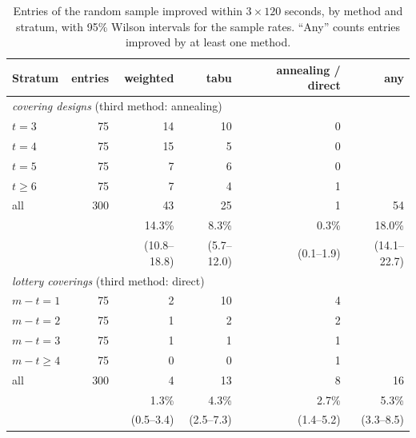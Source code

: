 \documentclass[11pt]{article}
\theoremstyle{remark}
\begin{document}
\begin{table}[t]
\centering
\begin{tabular}{lrrrrr}
\toprule
Stratum & entries & weighted & tabu & annealing / direct & any \\
\midrule
\multicolumn{6}{l}{\emph{covering designs} (third method: annealing)} \\
$t=3$ & 75 & 14 & 10 & 0 & \\
$t=4$ & 75 & 15 & 5 & 0 & \\
$t=5$ & 75 & 7 & 6 & 0 & \\
$t\ge 6$ & 75 & 7 & 4 & 1 & \\
all & 300 & 43 & 25 & 1 & 54 \\
 & & 14.3\% & 8.3\% & 0.3\% & 18.0\% \\
 & & (10.8--18.8) & (5.7--12.0) & (0.1--1.9) & (14.1--22.7) \\
\midrule
\multicolumn{6}{l}{\emph{lottery coverings} (third method: direct)} \\
$m-t=1$ & 75 & 2 & 10 & 4 & \\
$m-t=2$ & 75 & 1 & 2 & 2 & \\
$m-t=3$ & 75 & 1 & 1 & 1 & \\
$m-t\ge 4$ & 75 & 0 & 0 & 1 & \\
all & 300 & 4 & 13 & 8 & 16 \\
 & & 1.3\% & 4.3\% & 2.7\% & 5.3\% \\
 & & (0.5--3.4) & (2.5--7.3) & (1.4--5.2) & (3.3--8.5) \\
\bottomrule
\end{tabular}
\caption{Entries of the random sample improved within $3\times 120$ seconds, by method and stratum, with 95\% Wilson
intervals for the sample rates. ``Any'' counts entries improved by at least one method.}
\label{tab:random}
\end{table}
\end{document}
